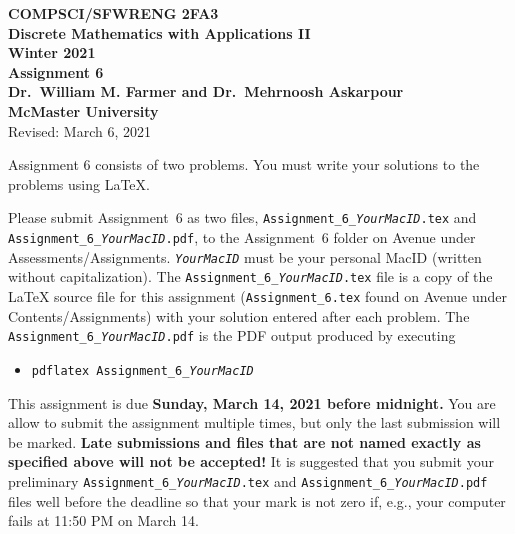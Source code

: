 \documentclass[11pt,fleqn]{article}
\begin{document}
	
	\begin{center}
		
		{\large \textbf{COMPSCI/SFWRENG 2FA3}}\\[2mm]
		{\large \textbf{Discrete Mathematics with Applications II}}\\[2mm]
		{\large \textbf{Winter 2021}}\\[8mm]
		{\huge \textbf{Assignment 6}}\\[6mm]
		{\large \textbf{Dr.~William M. Farmer and Dr.~Mehrnoosh Askarpour}}\\[2mm]
		{\large \textbf{McMaster University}}\\[6mm]
		{\large Revised: March 6, 2021}
		
	\end{center}
	
	\medskip
	
	Assignment 6 consists of two problems.  You must write your solutions
	to the problems using LaTeX.
	
	Please submit Assignment~6 as two files,
	\texttt{Assignment\_6\_\emph{YourMacID}.tex} and
	\texttt{Assignment\_6\_\emph{YourMacID}.pdf}, to the Assignment~6
	folder on Avenue under Assessments/Assignments.
	\texttt{\emph{YourMacID}} must be your personal MacID (written without
	capitalization).  The \texttt{Assignment\_6\_\emph{YourMacID}.tex}
	file is a copy of the LaTeX source file for this assignment
	(\texttt{Assignment\_6.tex} found on Avenue under
	Contents/Assignments) with your solution entered after each problem.
	The \texttt{Assignment\_6\_\emph{YourMacID}.pdf} is the PDF output
	produced by executing
	
	\begin{itemize}
		
		\item[] \texttt{pdflatex Assignment\_6\_\emph{YourMacID}}
		
	\end{itemize}
	
	This assignment is due \textbf{Sunday, March 14, 2021 before midnight.}
	You are allow to submit the assignment multiple times, but only the
	last submission will be marked.  \textbf{Late submissions and files
		that are not named exactly as specified above will not be accepted!}
	It is suggested that you submit your preliminary
	\texttt{Assignment\_6\_\emph{YourMacID}.tex} and
	\texttt{Assignment\_6\_\emph{YourMacID}.pdf} files well before the
	deadline so that your mark is not zero if, e.g., your computer fails
	at 11:50 PM on March 14.
	
\end{document}
